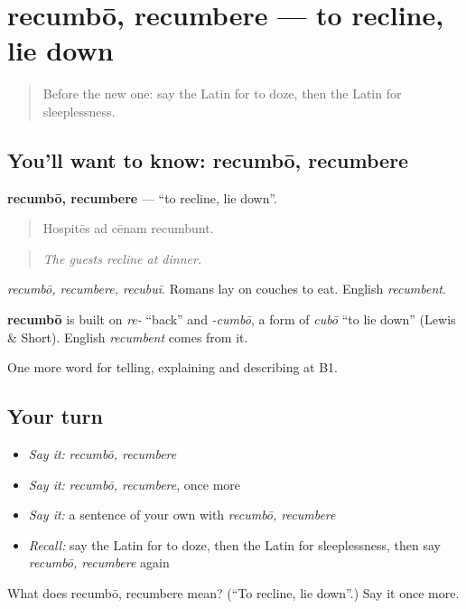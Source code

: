 \section[recumbō, recumbere]{recumbō, recumbere — to recline, lie down}

\label{lesson:LA-C527-recumbo}



\begin{quote}
Before the new one: say the Latin for to doze, then the Latin for sleeplessness.
\end{quote}

\subsection*{You'll want to know: recumbō, recumbere}
\textbf{recumbō, recumbere} — \textquotedblleft{}to recline, lie down\textquotedblright{}.

\begin{quote}
Hospitēs ad cēnam recumbunt.
\end{quote}

\begin{quote}
\emph{The guests recline at dinner.}
\end{quote}

\emph{recumbō, recumbere, recubuī}. Romans lay on couches to eat. English \emph{recumbent}.

\begin{cousinweb}
\textbf{recumbō} is built on \emph{re-} \textquotedblleft{}back\textquotedblright{} and \emph{-cumbō}, a form of \emph{cubō} \textquotedblleft{}to lie down\textquotedblright{} (Lewis \& Short). English \emph{recumbent} comes from it.
\end{cousinweb}

\begin{grammarlens}[title={What you've built}]
One more word for telling, explaining and describing at B1.
\end{grammarlens}

\subsection*{Your turn}
\begin{itemize}
\raggedright
  \item \emph{Say it:} \emph{recumbō, recumbere}
  \item \emph{Say it:} \emph{recumbō, recumbere}, once more
  \item \emph{Say it:} a sentence of your own with \emph{recumbō, recumbere}
  \item \emph{Recall:} say the Latin for to doze, then the Latin for sleeplessness, then say \emph{recumbō, recumbere} again
\end{itemize}

\begin{tcolorbox}[breakable,colback=teal!4,colframe=teal!35!black,title={Before you move on}]
What does recumbō, recumbere mean? (\textquotedblleft{}To recline, lie down\textquotedblright{}.) Say it once more.
\end{tcolorbox}
